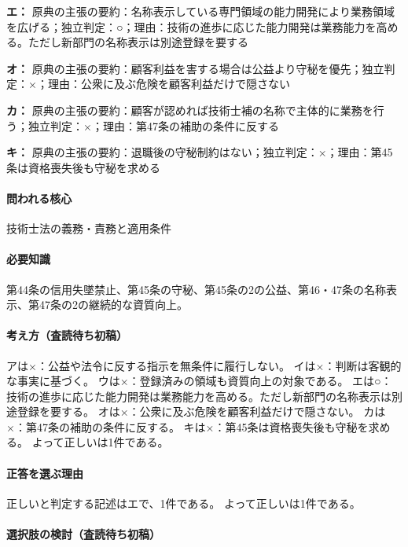\noindent\textbf{エ：} 原典の主張の要約：名称表示している専門領域の能力開発により業務領域を広げる；独立判定：○；理由：技術の進歩に応じた能力開発は業務能力を高める。ただし新部門の名称表示は別途登録を要する\par

\noindent\textbf{オ：} 原典の主張の要約：顧客利益を害する場合は公益より守秘を優先；独立判定：×；理由：公衆に及ぶ危険を顧客利益だけで隠さない\par

\noindent\textbf{カ：} 原典の主張の要約：顧客が認めれば技術士補の名称で主体的に業務を行う；独立判定：×；理由：第47条の補助の条件に反する\par

\noindent\textbf{キ：} 原典の主張の要約：退職後の守秘制約はない；独立判定：×；理由：第45条は資格喪失後も守秘を求める\par

\paragraph{問われる核心} 技術士法の義務・責務と適用条件

\paragraph{必要知識} 第44条の信用失墜禁止、第45条の守秘、第45条の2の公益、第46・47条の名称表示、第47条の2の継続的な資質向上。

\paragraph{考え方（査読待ち初稿）} アは×：公益や法令に反する指示を無条件に履行しない。 イは×：判断は客観的な事実に基づく。 ウは×：登録済みの領域も資質向上の対象である。 エは○：技術の進歩に応じた能力開発は業務能力を高める。ただし新部門の名称表示は別途登録を要する。 オは×：公衆に及ぶ危険を顧客利益だけで隠さない。 カは×：第47条の補助の条件に反する。 キは×：第45条は資格喪失後も守秘を求める。 よって正しいは1件である。

\paragraph{正答を選ぶ理由} 正しいと判定する記述はエで、1件である。  よって正しいは1件である。

\paragraph{選択肢の検討（査読待ち初稿）}\mbox{}\par

